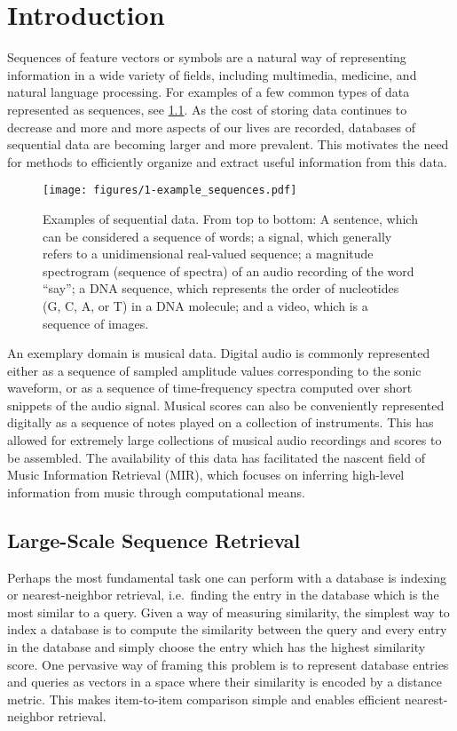 \chapter{Introduction}

Sequences of feature vectors or symbols are a natural way of representing information in a wide variety of fields, including multimedia, medicine, and natural language processing.
For examples of a few common types of data represented as sequences, see \cref{fig:example_sequences}.
As the cost of storing data continues to decrease and more and more aspects of our lives are recorded, databases of sequential data are becoming larger and more prevalent.
This motivates the need for methods to efficiently organize and extract useful information from this data.

\begin{figure}
  \texttt{[image: figures/1-example\_sequences.pdf]}
  \caption[Examples of sequential data]{Examples of sequential data.  From top to bottom: A sentence, which can be considered a sequence of words; a signal, which generally refers to a unidimensional real-valued sequence; a magnitude spectrogram (sequence of spectra) of an audio recording of the word ``say''; a DNA sequence, which represents the order of nucleotides (G, C, A, or T) in a DNA molecule; and a video, which is a sequence of images.}
  \label{fig:example_sequences}
\end{figure}

An exemplary domain is musical data.
Digital audio is commonly represented either as a sequence of sampled amplitude values corresponding to the sonic waveform, or as a sequence of time-frequency spectra computed over short snippets of the audio signal.
Musical scores can also be conveniently represented digitally as a sequence of notes played on a collection of instruments.
This has allowed for extremely large collections of musical audio recordings and scores to be assembled.
The availability of this data has facilitated the nascent field of Music Information Retrieval (MIR), which focuses on inferring high-level information from music through computational means.

\section{Large-Scale Sequence Retrieval}

Perhaps the most fundamental task one can perform with a database is indexing or nearest-neighbor retrieval, i.e.\ finding the entry in the database which is the most similar to a query.
Given a way of measuring similarity, the simplest way to index a database is to compute the similarity between the query and every entry in the database and simply choose the entry which has the highest similarity score.
One pervasive way of framing this problem is to represent database entries and queries as vectors in a space where their similarity is encoded by a distance metric.
This makes item-to-item comparison simple and enables efficient nearest-neighbor retrieval.

